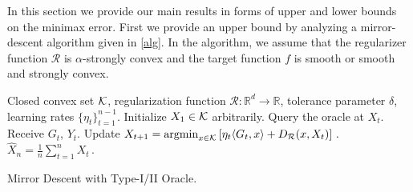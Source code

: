 In this section we provide our main results in forms of upper and lower bounds on the minimax error.
First we provide an upper bound by analyzing a mirror-descent algorithm given in \cref{alg}.
In the algorithm, we assume that the regularizer function $\mathcal{R}$ is $\alpha$-strongly convex and the target function $f$ is smooth or  smooth and strongly convex.

%

\begin{algorithm}[t]
\begin{algorithmic}
      Closed convex set $\mathcal{K}$, regularization function $\mathcal{R}:\mathbb{R}^d\to \mathbb{R}$, tolerance parameter $\delta$, learning rates $\{\eta_t\}_{t=1}^{n-1}$.
\State Initialize $X_1\in \mathcal{K}$ arbitrarily.
	\State Query the oracle at $X_t$.
	\State Receive $G_t$, $Y_t$.
	\State Update
	$
	X_{t+1}=\operatorname{argmin}_{x\in \mathcal{K}}\left[ \eta_{t} \langle G_t,x \rangle+D_{\mathcal{R}}(x,X_t) \right] \,.
	$
\EndFor
{} $\hat{X}_n = \frac{1}{n}\sum_{t=1}^n X_t \,.$
\end{algorithmic}
\caption{Mirror Descent with Type-I/II Oracle.}
\label{alg}
\end{algorithm}


%


